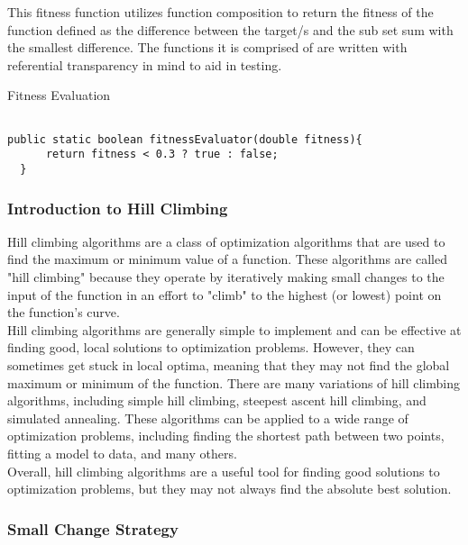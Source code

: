 \documentclass[a4paper]{article}
\begin{document}
This fitness function utilizes function composition to return the fitness of the function
defined as the difference between the target/s and the sub set sum with the smallest difference.
The functions it is comprised of are written with referential transparency in mind to aid in 
testing.


\vspace{8mm}
\begin{algorithm}
\caption{Fitness Evaluation}\label{euclid}

\begin{verbatim}

public static boolean fitnessEvaluator(double fitness){
      return fitness < 0.3 ? true : false;  
  }
\end{verbatim}
\end{algorithm}
\newpage






\vspace{8mm}
\subsubsection{Introduction to Hill Climbing}
Hill climbing algorithms are a class of optimization algorithms that are used to find the maximum or minimum value of a function.
These algorithms are called "hill climbing" because they operate by iteratively making small changes to the input of the function in an effort 
to "climb" to the highest (or lowest) point on the function's curve. \\

Hill climbing algorithms are generally simple to implement and can be effective at finding good, 
local solutions to optimization problems. 
However, they can sometimes get stuck in local optima, 
meaning that they may not find the global maximum or minimum of the function. 
There are many variations of hill climbing algorithms,
including simple hill climbing, steepest ascent hill climbing, and simulated annealing.
These algorithms can be applied to a wide range of optimization problems, including finding the shortest path between two points, 
fitting a model to data, and many others. \\

Overall, hill climbing algorithms are a useful tool for finding good solutions to optimization problems,
but they may not always find the absolute best solution. \\


\subsubsection{Small Change Strategy}
\end{document}
